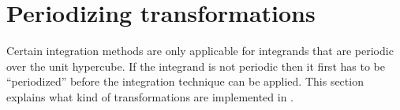 \chapter{Periodizing transformations} \label{chap:periodizing_transformations}


Certain integration methods are only applicable for integrands that are
periodic over the unit hypercube.  If
the integrand is not periodic then it first has to be ``periodized'' before
the integration technique can be applied.  This section explains what kind of
transformations are implemented in \qmcpack{}.

